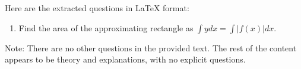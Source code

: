 Here are the extracted questions in LaTeX format:

\begin{enumerate}
\item Find the area of the approximating rectangle as $\int y dx = \int |f(x)| dx.$
\end{enumerate}

Note: There are no other questions in the provided text. The rest of the content appears to be theory and explanations, with no explicit questions.